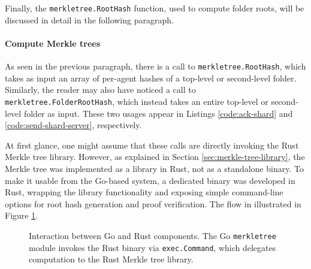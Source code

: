Finally, the \texttt{merkletree.RootHash} function, used to compute folder roots, will be discussed in detail in the following paragraph.

\paragraph{Compute Merkle trees}

As seen in the previous paragraph, there is a call to \texttt{merkletree.RootHash}, which
takes as input an array of per-agent hashes of a top-level or second-level folder. 
Similarly, the reader may also have noticed a call to 
\texttt{merkletree.FolderRootHash}, which instead takes an entire top-level or second-level
folder as input. These two usages appear in Listings \ref{code:ack-shard} and
\ref{code:send-shard-server}, respectively.  

At first glance, one might assume that these calls are directly invoking the Rust Merkle 
tree library. However, as explained in Section \ref{sec:merkle-tree-library}, the 
Merkle tree was implemented as a library in Rust, not as a standalone binary. 
To make it usable from the Go-based system, a dedicated binary was developed in Rust, 
wrapping the library functionality and exposing simple command-line options for root hash 
generation and proof verification. The flow in illustrated in Figure
\ref{fig:go-rust-merkle}.


\begin{figure}[h]
    \centering
    \caption{Interaction between Go and Rust components. The Go \texttt{merkletree} 
    module invokes the Rust binary via \texttt{exec.Command}, which delegates 
    computation to the Rust Merkle tree library.}
    \label{fig:go-rust-merkle}
\end{figure}

